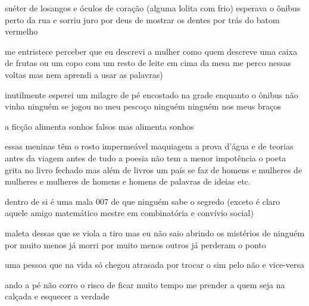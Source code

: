 \begin{poem}
\begin{stanza}
suéter de losangos e óculos de coração\verseline
(alguma lolita com frio)\verseline
esperava o ônibus perto da rua\verseline
e sorriu \qquad juro por deus\verseline
de mostrar os dentes\verseline
por trás do batom vermelho
\end{stanza}
\begin{stanza}
me entristece perceber que eu descrevi a mulher\verseline
como quem descreve uma caixa de frutas\verseline
ou um copo com um resto de leite\verseline
em cima da mesa\verseline
me perco nessas voltas\verseline
mas nem aprendi\verseline
a usar as palavras)
\end{stanza}
\begin{stanza}
inutilmente esperei um milagre\verseline
de pé encostado na grade\verseline
enquanto o ônibus não vinha\verseline
ninguém se jogou no meu pescoço\verseline
ninguém ninguém nos meus braços
\end{stanza}
a ficção alimenta sonhos falsos\verseline
mas alimenta sonhos
\begin{stanza}
essas meninas têm o rosto impermeável\verseline
maquiagem a prova d'água e de teorias\verseline
antes da viagem \qquad antes de tudo\verseline
a poesia não tem a menor impotência\verseline
o poeta grita no livro fechado\verseline
mas além de livros um país\verseline
se faz de homens e mulheres\verseline
de mulheres e mulheres\verseline
de homens e homens\verseline
de palavras\verseline
de ideias\verseline
etc.
\end{stanza}
\begin{stanza}
dentro de si é uma mala 007\verseline
de que ninguém sabe o segredo\verseline
(exceto é claro aquele amigo\verseline
matemático mestre em combinatória\verseline
e convívio social)
\end{stanza}
\begin{stanza}
maleta dessas que se viola a tiro\verseline
mas eu não saio abrindo\verseline
os mistérios de ninguém\verseline
por muito menos já morri\verseline
por muito menos outros\verseline
já perderam o ponto
\end{stanza}
\begin{stanza}
uma pessoa que na vida\verseline
só chegou atrasada\verseline
por trocar o sim pelo não e vice-versa
\end{stanza}
\begin{stanza}
ando a pé
não corro o risco de ficar muito tempo\verseline
me prender a quem seja na calçada\verseline
e esquecer \qquad a verdade
\end{stanza}
\begin{stanza}
\verseline
\center{\textit{[[repeat]]}}
\end{stanza}
\end{poem}